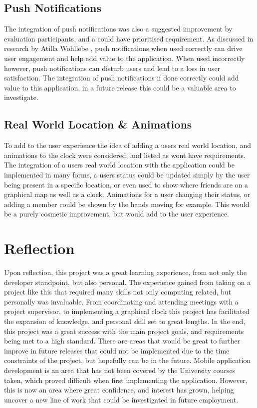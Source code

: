 \subsection*{Push Notifications}
The integration of push notifications was also a suggested improvement by evaluation participants, and a could have prioritised requirement. As discussed in research by Atilla Wohllebe \cite{pushNoti}, push notifications when used correctly can drive user engagement and help add value to the application. When used incorrectly however, push notifications can disturb users and lead to a loss in user satisfaction. The integration of push notifications if done correctly could add value to this application, in a future release this could be a valuable area to investigate.

\subsection*{Real World Location \& Animations}
To add to the user experience the idea of adding a users real world location, and animations to the clock were considered, and listed as wont have requirements. The integration of a users real world location with the application could be implemented in many forms, a users status could be updated simply by the user being present in a specific location, or even used to show where friends are on a graphical map as well as a clock. Animations for a user changing their status, or adding a member could be shown by the hands moving for example. This would be a purely cosmetic improvement, but would add to the user experience.

\section{Reflection}

Upon reflection, this project was a great learning experience, from not only the developer standpoint, but also personal. The experience gained from taking on a project like this that required many skills not only computing related, but personally was invaluable. From coordinating and attending meetings with a project supervisor, to implementing a graphical clock this project has facilitated the expansion of knowledge, and personal skill set to great lengths. In the end, this project was a great success with the main project goals, and requirements being met to a high standard. There are areas that would be great to further improve in future releases that could not be implemented due to the time constraints of the project, but hopefully can be in the future. Mobile application development is an area that has not been covered by the University courses taken, which proved difficult when first implementing the application. However, this is now an area where great confidence, and interest has grown, helping uncover a new line of work that could be investigated in future employment.  